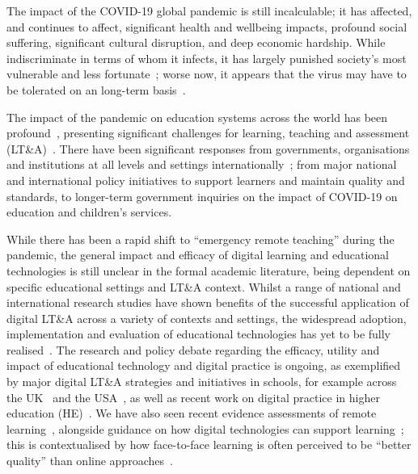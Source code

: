 \documentclass[conference]{IEEEtran}
\begin{document}
The impact of the COVID-19 global pandemic is
still incalculable; it has affected, and continues to affect,
significant health and wellbeing impacts, profound social suffering,
significant cultural disruption, and deep economic hardship. While
indiscriminate in terms of whom it infects, it has largely punished
society’s most vulnerable and less
fortunate~\cite{vonbraun-et-al:2020,lancetcovid:2020,vanlancker+parolin:2020};
worse now, it appears that the virus may have to be tolerated on an
long-term basis~\cite{kissler-et-al:2020}.

The impact of the pandemic on education systems across the world has
been profound~\cite{unescocovidedu:2020,armitage+nellums:2020},
presenting significant challenges for learning, teaching and
assessment (LT\&A)~\cite{doucet-et-al:2020,oecd:2020,aace:2020}. There
have been significant responses from governments, organisations and
institutions at all levels and settings
internationally~\cite{who:2020}; from major national and international
policy initiatives to support learners and maintain quality and
standards, to longer-term government inquiries on the impact of
COVID-19 on education and children’s services.


While there has been a rapid shift to ``emergency remote teaching''
during the pandemic, the general impact and efficacy of digital
learning and educational technologies is still unclear in the formal
academic literature, being dependent on specific educational settings
and LT\&A context. Whilst a range of national and international
research studies have shown benefits of the successful application of
digital LT\&A across a variety of contexts and settings, the
widespread adoption, implementation and evaluation of educational
technologies has yet to be fully
realised~\cite{decodinglearning:2012,means:2014,ecjrc:2017,mayer:2018}.
The research and policy debate regarding the efficacy, utility and
impact of educational technology and digital practice is ongoing, as
exemplified by major digital LT\&A strategies and initiatives in
schools, for example across the
UK~\cite{digscot:2016,wgdcfguidance:2018,dfe:2019,crick:berari2020} and the
USA~\cite{usdoe:2020}, as well as recent work on digital practice in
higher education (HE)~\cite{jisc:2020,wef:2020,qaadigtaxonomy:2020}. We have also seen
recent evidence assessments of remote learning~\cite{eefremote:2020},
alongside guidance on how digital technologies can support
learning~\cite{eefdigtech:2019}; this is contextualised by how
face-to-face learning is often perceived to be ``better quality'' than
online approaches~\cite{paechter+maier:ihe2010,scbbcnews:2020}.
\end{document}
